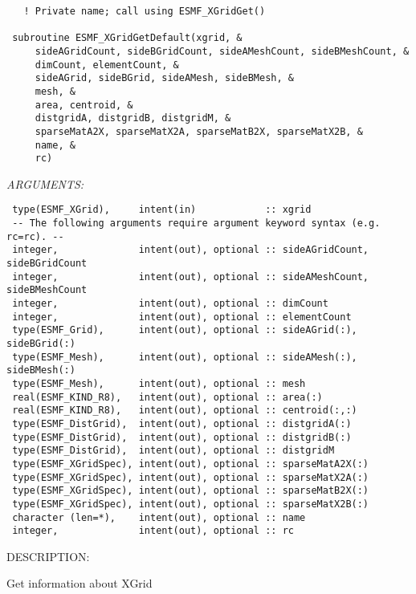  
\begin{verbatim}   ! Private name; call using ESMF_XGridGet()
 
 subroutine ESMF_XGridGetDefault(xgrid, &
     sideAGridCount, sideBGridCount, sideAMeshCount, sideBMeshCount, &
     dimCount, elementCount, &
     sideAGrid, sideBGrid, sideAMesh, sideBMesh, &
     mesh, &
     area, centroid, &
     distgridA, distgridB, distgridM, &
     sparseMatA2X, sparseMatX2A, sparseMatB2X, sparseMatX2B, &
     name, &
     rc) 
 \end{verbatim}{\em ARGUMENTS:}
\begin{verbatim} type(ESMF_XGrid),     intent(in)            :: xgrid
 -- The following arguments require argument keyword syntax (e.g. rc=rc). --
 integer,              intent(out), optional :: sideAGridCount, sideBGridCount
 integer,              intent(out), optional :: sideAMeshCount, sideBMeshCount
 integer,              intent(out), optional :: dimCount
 integer,              intent(out), optional :: elementCount
 type(ESMF_Grid),      intent(out), optional :: sideAGrid(:), sideBGrid(:)
 type(ESMF_Mesh),      intent(out), optional :: sideAMesh(:), sideBMesh(:)
 type(ESMF_Mesh),      intent(out), optional :: mesh
 real(ESMF_KIND_R8),   intent(out), optional :: area(:)
 real(ESMF_KIND_R8),   intent(out), optional :: centroid(:,:)
 type(ESMF_DistGrid),  intent(out), optional :: distgridA(:)
 type(ESMF_DistGrid),  intent(out), optional :: distgridB(:)
 type(ESMF_DistGrid),  intent(out), optional :: distgridM
 type(ESMF_XGridSpec), intent(out), optional :: sparseMatA2X(:)
 type(ESMF_XGridSpec), intent(out), optional :: sparseMatX2A(:)
 type(ESMF_XGridSpec), intent(out), optional :: sparseMatB2X(:)
 type(ESMF_XGridSpec), intent(out), optional :: sparseMatX2B(:)
 character (len=*),    intent(out), optional :: name
 integer,              intent(out), optional :: rc \end{verbatim}
{\sf DESCRIPTION:\\ }


        Get information about XGrid
  
